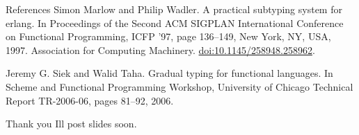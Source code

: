 \documentclass[
  ignorenonframetext,
  aspectratio=169]{beamer}
\begin{document}
\begin{frame}{References}
\label{references-1}
Simon Marlow and Philip Wadler. A practical subtyping system for erlang.
In Proceedings of the Second ACM SIGPLAN International Conference on
Functional Programming, ICFP '97, page 136--149, New York, NY, USA,
1997. Association for Computing Machinery.
\url{doi:10.1145/258948.258962}.

Jeremy G. Siek and Walid Taha. Gradual typing for functional languages.
In Scheme and Functional Programming Workshop, University of Chicago
Technical Report TR-2006-06, pages 81--92, 2006.
\end{frame}

\begin{frame}{Thank you}
\label{thank-you}
I\textquotesingle ll post slides soon.
\end{frame}
\end{document}
